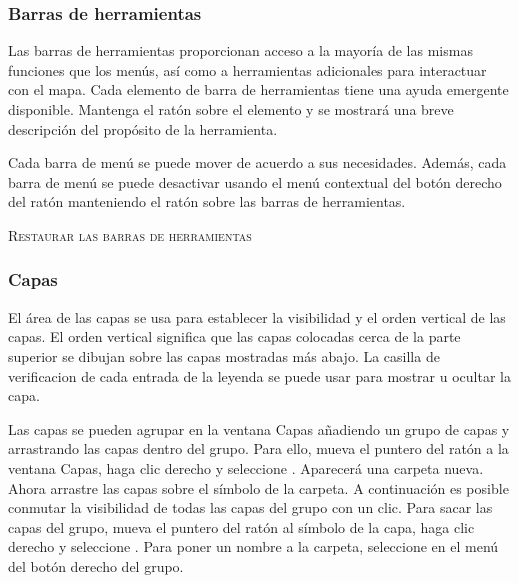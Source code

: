 
\subsubsection{Barras de herramientas}\label{label_toolbars}

Las barras de herramientas proporcionan acceso a la mayoría de las mismas funciones que los menús,
así como a herramientas adicionales para interactuar con el mapa. Cada elemento de barra de herramientas tiene
una ayuda emergente disponible. Mantenga el ratón sobre el elemento y se mostrará una breve descripción del
propósito de la herramienta.

Cada barra de menú se puede mover de acuerdo a sus necesidades. Además, cada
barra de menú se puede desactivar usando el menú contextual del botón derecho del ratón manteniendo el ratón sobre las barras de herramientas.

\begin{Tip}
\caption{\textsc{Restaurar las barras de herramientas}} 
\end{Tip}

\subsubsection{Capas}\label{label_legend}

El área de las capas se usa para establecer la visibilidad y el orden vertical de las capas.
El orden vertical significa que las capas colocadas cerca de la parte superior se dibujan
sobre
las capas mostradas más abajo. La casilla de verificacion de cada entrada de la leyenda
se puede usar para mostrar u ocultar la capa.

Las capas se pueden agrupar en la ventana Capas añadiendo un grupo de capas y arrastrando las capas 
dentro del grupo. Para ello, mueva el puntero del ratón a la ventana Capas, haga clic derecho y seleccione . 
Aparecerá una carpeta nueva. Ahora arrastre las capas sobre el símbolo de la carpeta. A continuación es posible
conmutar la visibilidad de todas las capas del grupo con un clic. Para sacar las capas del grupo, mueva 
el puntero del ratón al símbolo de la capa, haga clic derecho y seleccione . 
Para poner un nombre a la carpeta, seleccione  en el menú del botón derecho del grupo.

